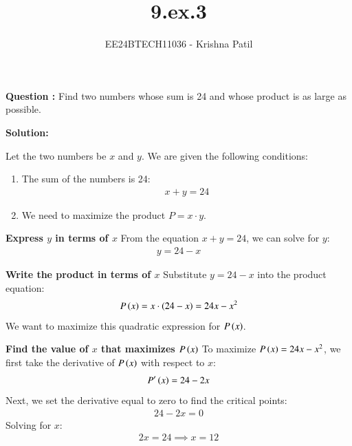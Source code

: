 \documentclass[journal]{IEEEtran}
\begin{document}

\vspace{3cm}

\title{9.ex.3}
\author{EE24BTECH11036 - Krishna Patil}
{\let\newpage\relax\maketitle}

\renewcommand{\thefigure}{\theenumi}
\renewcommand{\thetable}{\theenumi}
\setlength{\intextsep}{10pt} %

\textbf{Question :}  Find two numbers whose sum is 24 and whose product is as large as possible.

\textbf{Solution:}

Let the two numbers be $ x $ and $ y $. We are given the following conditions:

\begin{enumerate}
    \item The sum of the numbers is 24:
    \begin{align}
        x + y = 24
    \end{align}
    \item We need to maximize the product $ P = x \cdot y $.
\end{enumerate}

\textbf{Express $ y $ in terms of $ x $}  
From the equation $ x + y = 24 $, we can solve for $ y $:
\begin{align}
    y = 24 - x
\end{align}

\textbf{Write the product in terms of $ x $}  
Substitute $ y = 24 - x $ into the product equation:
\begin{align}
    P\left(x\right) = x \cdot \left(24 - x\right) = 24x - x^2
\end{align}
We want to maximize this quadratic expression for $ P\left(x\right) $.

\textbf{Find the value of $ x $ that maximizes $ P\left(x\right) $}  
To maximize $ P\left(x\right) = 24x - x^2 $, we first take the derivative of $ P\left(x\right) $ with respect to $ x $:
\begin{align}
    P{^\prime}\left(x\right) = 24 - 2x
\end{align}
Next, we set the derivative equal to zero to find the critical points:
\begin{align}
    24 - 2x = 0
\end{align}
Solving for $ x $:
\begin{align}
    2x = 24 \implies x = 12
\end{align}
\end{document}
